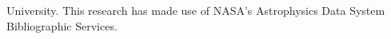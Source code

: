 \documentclass[linenumbers,tighten,trackchanges,twocolumn]{aastex631}
\begin{document}
\begin{acknowledgments}
University. This research has made use of NASA's Astrophysics Data System Bibliographic Services.

\end{acknowledgments}

{}


\end{document}
